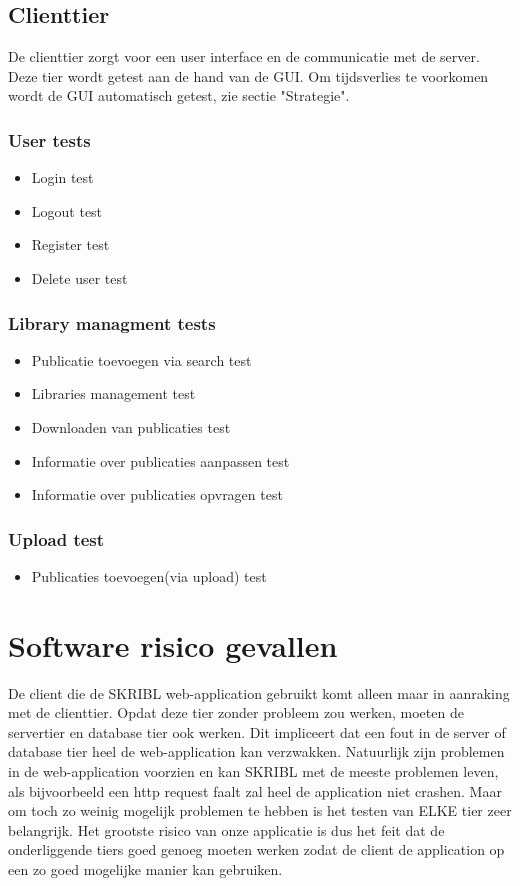 \documentclass{article}
\begin{document}
\subsection{Clienttier}
De clienttier zorgt voor een user interface en de communicatie met de server. Deze tier wordt getest aan de hand van de GUI. Om tijdsverlies te voorkomen wordt de GUI automatisch getest, zie sectie "Strategie".
\subsubsection{User tests}
\begin{itemize}
  \item Login test
  \item Logout test 
  \item Register test
  \item Delete user test
\end{itemize}
\subsubsection{Library managment tests}
\begin{itemize}
  \item Publicatie toevoegen via search test
  \item Libraries management test
  \item Downloaden van publicaties test
  \item Informatie over publicaties aanpassen test
  \item Informatie over publicaties opvragen test
\end{itemize}
\subsubsection{Upload test}
\begin{itemize}
  \item Publicaties toevoegen(via upload) test
\end{itemize}
\section{Software risico gevallen}
De client die de SKRIBL web-application gebruikt komt alleen maar in aanraking met de clienttier. Opdat deze tier zonder probleem zou werken, moeten de servertier en database tier ook werken. Dit impliceert dat een fout in de server of database tier heel de web-application kan verzwakken. Natuurlijk zijn problemen in de web-application voorzien en kan SKRIBL met de meeste problemen leven, als bijvoorbeeld een http request faalt zal heel de application niet crashen. Maar om toch zo weinig mogelijk problemen te hebben is het testen  van ELKE tier zeer belangrijk. Het grootste risico van onze applicatie is dus het feit dat de onderliggende tiers goed genoeg moeten werken zodat de client de application op een zo goed mogelijke manier kan gebruiken.
%
\end{document}
